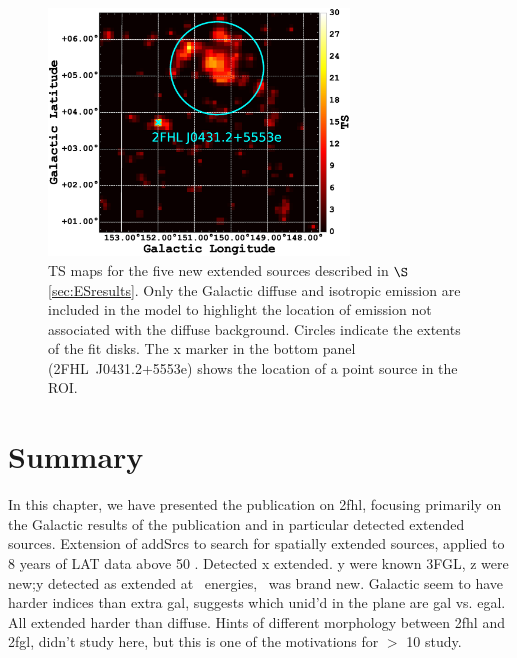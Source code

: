 \begin{figure}[!ht]
\begin{centering}
		\includegraphics[width=8cm]{Figures/l145_b0_ES_1_residTSmap_2FHL_zoom.eps}
		\caption{TS maps for the five new extended sources described in $\S$ \ref{sec:ESresults}.  Only the Galactic diffuse and isotropic emission are included in the model to highlight the location of emission not associated with the diffuse background. Circles indicate the extents of the fit disks. {The x marker in the bottom panel (2FHL~J0431.2+5553e) shows the location of a point source in the ROI.}
			\label{fig:6ES}}
		
	\end{centering}
\end{figure}

\section{\label{2FGL:summ}Summary} In this chapter, we have presented the publication on \gls{2fhl}, focusing primarily on the Galactic results of the publication and in particular detected extended sources. Extension of addSrcs to search for spatially extended sources, applied to 8 years  of LAT data above 50 \gev. Detected x extended. y were known 3FGL, z were new;y detected as extended at \gev~energies, \gone ~was brand new. Galactic seem to have harder indices than extra gal, suggests which unid'd in the plane are gal vs. egal. All extended harder than diffuse. Hints of different morphology between \gls{2fhl} and \gls{2fgl}, didn't study here, but this is one of the motivations for $>$ 10 \gev study.






